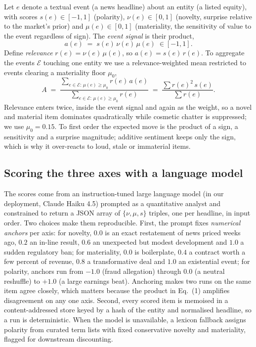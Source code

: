 \documentclass[12pt,a4paper]{article}
\begin{document}
Let $e$ denote a textual event (a news headline) about an entity (a listed equity),
with scores $s(e)\in[-1,1]$ (polarity), $\nu(e)\in[0,1]$ (novelty, surprise relative
to the market's prior) and $\mu(e)\in[0,1]$ (materiality, the sensitivity of value
to the event regardless of sign). The \emph{event signal} is their product,
\begin{equation}
a(e) \;=\; s(e)\,\nu(e)\,\mu(e)\;\in[-1,1].
\end{equation}
Define \emph{relevance} $r(e)=\nu(e)\,\mu(e)$, so $a(e)=s(e)\,r(e)$. To aggregate
the events $\mathcal{E}$ touching one entity we use a relevance-weighted mean
restricted to events clearing a materiality floor $\mu_0$,
\begin{equation}
A \;=\; \frac{\sum_{e\in\mathcal{E}:\,\mu(e)\ge\mu_0} r(e)\,a(e)}
{\sum_{e\in\mathcal{E}:\,\mu(e)\ge\mu_0} r(e)}\;=\;\frac{\sum r(e)^2\,s(e)}{\sum r(e)}.
\end{equation}
Relevance enters twice, inside the event signal and again as the weight, so a novel
and material item dominates quadratically while cosmetic chatter is suppressed; we
use $\mu_0=0.15$. To first order the expected move is the product of a sign, a
sensitivity and a surprise magnitude; additive sentiment keeps only the sign, which
is why it over-reacts to loud, stale or immaterial items.

\subsection{Scoring the three axes with a language model}

The scores come from an instruction-tuned large language model (in our deployment,
Claude Haiku 4.5) prompted as a quantitative analyst and constrained to return a
JSON array of $\{\nu,\mu,s\}$ triples, one per headline, in input order. Two choices
make them reproducible. First, the prompt fixes \emph{numerical anchors} per axis:
for novelty, $0.0$ is an exact restatement of news priced weeks ago, $0.2$ an
in-line result, $0.6$ an unexpected but modest development and $1.0$ a sudden
regulatory ban; for materiality, $0.0$ is boilerplate, $0.4$ a contract worth a few
percent of revenue, $0.8$ a transformative deal and $1.0$ an existential event; for
polarity, anchors run from $-1.0$ (fraud allegation) through $0.0$ (a neutral
reshuffle) to $+1.0$ (a large earnings beat). Anchoring makes two runs on the same
item agree closely, which matters because the product in Eq.~(1) amplifies
disagreement on any one axis. Second, every scored item is memoised in a
content-addressed store keyed by a hash of the entity and normalised headline, so a
run is deterministic. When the model is unavailable, a lexicon fallback assigns
polarity from curated term lists with fixed conservative novelty and materiality,
flagged for downstream discounting.
\end{document}
